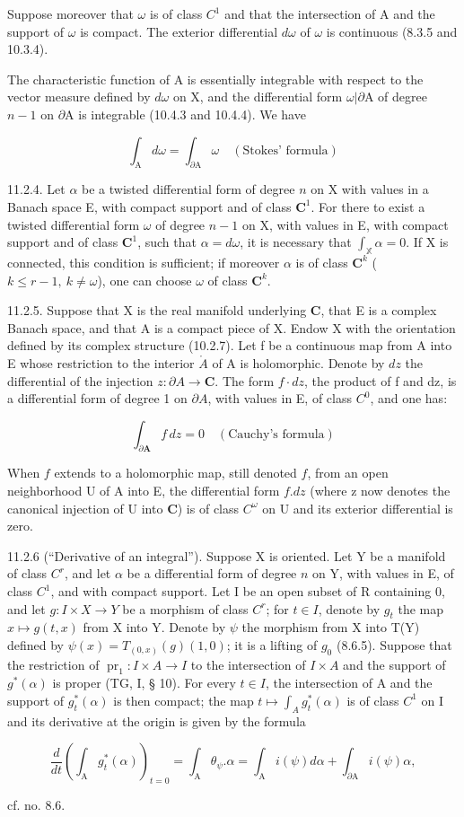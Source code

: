 Suppose moreover that \(\omega\) is of class \(C^{1}\) and that the intersection of A and the support of \(\omega\) is compact. The exterior differential \(d\omega\) of \(\omega\) is continuous (8.3.5 and 10.3.4).

The characteristic function of A is essentially integrable with respect to the vector measure defined by \(d\omega\) on X, and the differential form \(\omega|\partial\mathrm{A}\) of degree \(n-1\) on \(\partial\mathrm{A}\) is integrable (10.4.3 and 10.4.4). We have

\[
\int_ {\mathrm{A}} d \omega = \int_ {\partial \mathrm{A}} \omega \quad (\text{Stokes' formula})
\]

11.2.4. Let \(\alpha\) be a twisted differential form of degree \(n\) on X with values in a Banach space E, with compact support and of class \(\mathbf{C}^1\). For there to exist a twisted differential form \(\omega\) of degree \(n - 1\) on X, with values in E, with compact support and of class \(\mathbf{C}^1\), such that \(\alpha = d\omega\), it is necessary that \(\int_{\mathbb{X}} \alpha = 0\). If X is connected, this condition is sufficient; if moreover \(\alpha\) is of class \(\mathbf{C}^k\) (\(k\leqslant r-1,\ k\neq\omega\)), one can choose \(\omega\) of class \(\mathbf{C}^k\).

11.2.5. Suppose that X is the real manifold underlying \(\mathbf{C}\), that E is a complex Banach space, and that A is a compact piece of X. Endow X with the orientation defined by its complex structure (10.2.7). Let f be a continuous map from A into E whose restriction to the interior \(\mathring{A}\) of A is holomorphic. Denote by \(dz\) the differential of the injection \(z\colon\partial A\to\mathbf{C}\). The form \(f\cdot dz\), the product of f and dz, is a differential form of degree 1 on \(\partial A\), with values in E, of class \(C^{0}\), and one has:

\[
\int_ {\partial \mathbf {A}} f\, d z = 0 \quad (\text{Cauchy's formula})
\]

When \(f\) extends to a holomorphic map, still denoted \(f\), from an open neighborhood U of A into E, the differential form \(f.dz\) (where z now denotes the canonical injection of U into \(\mathbf{C}\)) is of class \(C^{\omega}\) on U and its exterior differential is zero.

11.2.6 (“Derivative of an integral”). Suppose X is oriented. Let Y be a manifold of class \(C^{r}\), and let \(\alpha\) be a differential form of degree \(n\) on Y, with values in E, of class \(C^{1}\), and with compact support. Let I be an open subset of R containing 0, and let \(g: I \times X \to Y\) be a morphism of class \(C^{r}\); for \(t \in I\), denote by \(g_{t}\) the map \(x \mapsto g(t, x)\) from X into Y. Denote by \(\psi\) the morphism from X into T(Y) defined by \(\psi(x) = T_{(0,x)}(g)(1,0)\); it is a lifting of \(g_{0}\) (8.6.5). Suppose that the restriction of \(\operatorname{pr}_{1}\colon I\times A\to I\) to the intersection of \(I\times A\) and the support of \(g^{*}(\alpha)\) is proper (TG, I, § 10). For every \(t \in I\), the intersection of A and the support of \(g_{t}^{*}(\alpha)\) is then compact; the map \(t \mapsto \int_{A} g_{t}^{*}(\alpha)\) is of class \(C^{1}\) on I and its derivative at the origin is given by the formula

\[
\frac {d}{d t} \left(\int_ {\mathrm{A}} g _ {t} ^ {*} (\alpha)\right) _ {t = 0} = \int_ {\mathrm{A}} \theta_ {\psi}. \alpha = \int_ {\mathrm{A}} i (\psi) d \alpha + \int_ {\partial \mathrm{A}} i (\psi) \alpha ,
\]

cf. no. 8.6.

